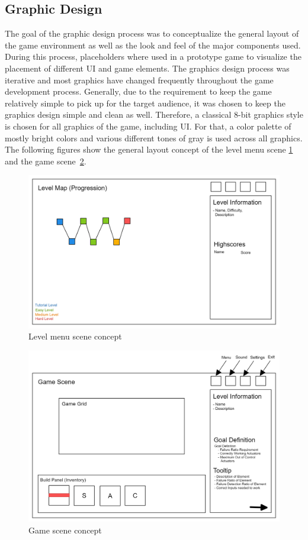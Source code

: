 \subsection{Graphic Design}\label{subsec:graphic-design}
The goal of the graphic design process was to conceptualize the general layout of the game environment as well as the look and feel
of the major components used.
During this process, placeholders where used in a prototype game to visualize the placement of different UI and game elements.
The graphics design process was iterative and most graphics have changed frequently throughout the game development process.
Generally, due to the requirement to keep the game relatively simple to pick up for the target audience, it was chosen to keep
the graphics design simple and clean as well.
Therefore, a classical 8-bit graphics style is chosen for all graphics of the game, including UI.
For that, a color palette of mostly bright colors and various different tones of gray is used across all graphics.
\\
The following figures show the general layout concept of the level
menu scene \ref{fig:level-menu-scene-concept} and the game scene~\ref{fig:game-scene-concept}.
\begin{figure}
    \includegraphics[width=\textwidth]{Pictures/res/concept/level-menu-scene-concept}
    \caption{Level menu scene concept}
    \label{fig:level-menu-scene-concept}
\end{figure}
\begin{figure}
    \includegraphics[width=\textwidth]{Pictures/res/concept/game-scene-concept}
    \caption{Game scene concept}
    \label{fig:game-scene-concept}
\end{figure}

